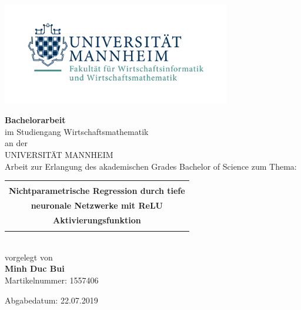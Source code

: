 
\thispagestyle{empty}

\begin{center}
\includegraphics[width=10cm]{Bilder/Logo3.png}

\bigskip

\textbf{\LARGE{ Bachelorarbeit}\\}
\bigskip
im Studiengang Wirtschaftsmathematik \\
an der \\
UNIVERSIT\"AT MANNHEIM\\
\bigskip
\LARGE{Arbeit zur Erlangung des akademischen Grades Bachelor of Science zum Thema:}

\bigskip


\begin{tabular}{|c|}
\hline
\\
\textbf{\LARGE{Nichtparametrische Regression durch tiefe}}\\
\textbf{\LARGE{neuronale Netzwerke mit ReLU}}\\
\textbf{\LARGE{Aktivierungsfunktion}}\\
\\
\hline
\end{tabular}
\bigskip
\bigskip
\bigskip
\large{\\vorgelegt von} \\
\Large{\textbf{Minh Duc Bui}}\\
Martikelnummer: 1557406


\bigskip
\bigskip
Abgabedatum: 22.07.2019\\
\end{center}


